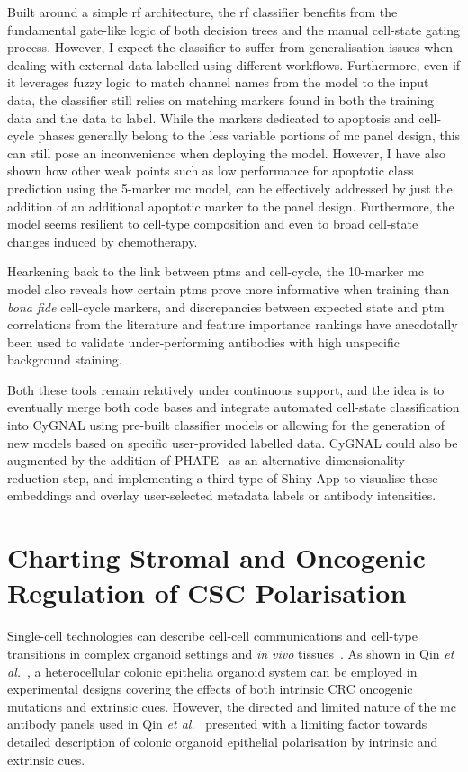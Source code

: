 Built around a simple \acrfull{rf} architecture, the \acrshort{rf} classifier benefits from the fundamental gate-like logic of both decision trees and the manual cell-state gating process. However, I expect the classifier to suffer from generalisation issues when dealing with external data labelled using different workflows. Furthermore, even if it leverages fuzzy logic to match channel names from the model to the input data, the classifier still relies on matching markers found in both the training data and the data to label. While the markers dedicated to apoptosis and cell-cycle phases generally belong to the less variable portions of \acrshort{mc} panel design, this can still pose an inconvenience when deploying the model. However, I have also shown how other weak points such as low performance for apoptotic class prediction using the 5-marker \acrshort{mc} model, can be effectively addressed by just the addition of an additional apoptotic marker to the panel design. Furthermore, the model seems resilient to cell-type composition and even to broad cell-state changes induced by chemotherapy.

Hearkening back to the link between \acrshort{ptm}s and cell-cycle, the 10-marker \acrshort{mc} model also reveals how certain \acrshort{ptm}s prove more informative when training than \emph{bona fide} cell-cycle markers, and discrepancies between expected state and \acrshort{ptm} correlations from the literature and feature importance rankings have anecdotally been used to validate under-performing antibodies with high unspecific background staining.

Both these tools remain relatively under continuous support, and the idea is to eventually merge both code bases and integrate automated cell-state classification into CyGNAL using pre-built classifier models or allowing for the generation of new models based on specific user-provided labelled data.
CyGNAL could also be augmented by the addition of PHATE~\cite{moon_visualizing_2019} as an alternative dimensionality reduction step, and implementing a third type of Shiny-App to visualise these embeddings and overlay user-selected metadata labels or antibody intensities.


\section{Charting Stromal and Oncogenic Regulation of CSC Polarisation}

Single-cell technologies can describe cell-cell communications and cell-type transitions in complex organoid settings and \emph{in vivo} tissues~\cite{qin_deciphering_2020, sqjin_sqjincellchat_2021, bues_deterministic_2022}. As shown in Qin \emph{et al.}~\cite{qin_cell-type-specific_2020}, a heterocellular colonic epithelia organoid system can be employed in experimental designs covering the effects of both intrinsic CRC oncogenic mutations and extrinsic cues. However, the directed and limited nature of the \acrshort{mc} antibody panels used in Qin \emph{et al.}~\cite{qin_cell-type-specific_2020} presented with a limiting factor towards detailed description of colonic organoid epithelial polarisation by intrinsic and extrinsic cues. 

